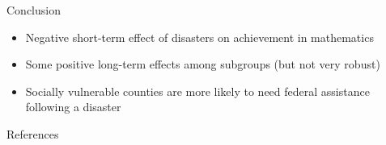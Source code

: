 \documentclass[hyperref={colorlinks = true,linkcolor = blue, citecolor=blue,urlcolor=blue}]{beamer}
\begin{document}
\begin{frame}{Conclusion}
	\begin{itemize}
		\item Negative short-term effect of disasters on achievement in mathematics
		\item Some positive long-term effects among subgroups (but not very robust)
		\item Socially vulnerable counties are more likely to need federal assistance following a disaster
	\end{itemize}
\end{frame}



\begin{frame}{References}
	
	
\end{frame}
\end{document}
